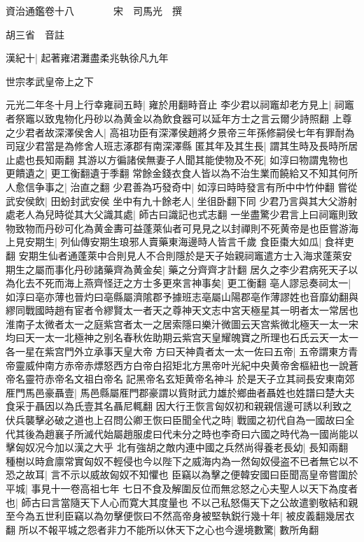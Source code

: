 資治通鑑卷十八　　　　宋　司馬光　撰

胡三省　音註

漢紀十|{
	起著雍涒灘盡柔兆執徐凡九年}


世宗孝武皇帝上之下

元光二年冬十月上行幸雍祠五畤|{
	雍於用翻畤音止}
李少君以祠竈却老方見上|{
	祠竈者祭竈以致鬼物化丹砂以為黄金以為飲食器可以延年方士之言云爾少詩照翻}
上尊之少君者故深澤侯舍人|{
	高祖功臣有深澤侯趙將夕景帝三年孫修嗣侯七年有罪耐為司寇少君當是為修舍人班志涿郡有南深澤縣}
匿其年及其生長|{
	謂其生時及長時所居止處也長知兩翻}
其游以方徧諸侯無妻子人聞其能使物及不死|{
	如淳曰物謂鬼物也}
更饋遺之|{
	更工衡翻遺于季翻}
常餘金錢衣食人皆以為不治生業而饒給又不知其何所人愈信争事之|{
	治直之翻}
少君善為巧發奇中|{
	如淳曰時時發言有所中中竹仲翻}
嘗從武安侯飲|{
	田蚡封武安侯}
坐中有九十餘老人|{
	坐徂卧翻下同}
少君乃言與其大父游射處老人為兒時從其大父識其處|{
	師古曰識記也式志翻}
一坐盡驚少君言上曰祠竈則致物致物而丹砂可化為黄金夀可益蓬萊仙者可見見之以封禪則不死黄帝是也臣嘗游海上見安期生|{
	列仙傳安期生琅邪人賣藥東海邊時人皆言千歲}
食臣棗大如瓜|{
	食祥吏翻}
安期生仙者通蓬萊中合則見人不合則隱於是天子始親祠竈遣方士入海求蓬萊安期生之屬而事化丹砂諸藥齊為黄金矣|{
	藥之分齊齊才計翻}
居久之李少君病死天子以為化去不死而海上燕齊怪迂之方士多更來言神事矣|{
	更工衡翻}
亳人謬忌奏祠太一|{
	如淳曰亳亦薄也晉灼曰亳縣屬濟隂郡予據班志亳屬山陽郡亳作薄謬姓也音靡幼翻與繆同戰國時趙有宦者令繆賢太一者天之尊神天文志中宮天極星其一明者太一常居也淮南子太微者太一之庭紫宫者太一之居索隱曰樂汁微圖云天宫紫微北極天一太一宋均曰天一太一北極神之别名春秋佐助期云紫宫天皇耀魄寶之所理也石氏云天一太一各一星在紫宫門外立承事天皇大帝}
方曰天神貴者太一太一佐曰五帝|{
	五帝謂東方青帝靈威仲南方赤帝赤熛怒西方白帝白招矩北方黑帝叶光紀中央黄帝舍樞紐也一說蒼帝名靈符赤帝名文祖白帝名記黑帝名玄矩黄帝名神斗}
於是天子立其祠長安東南郊　㕍門馬邑豪聶壹|{
	馬邑縣屬㕍門郡豪謂以貲財武力雄於鄉曲者聶姓也姓譜曰楚大夫食采于聶因以為氏壹其名聶尼輒翻}
因大行王恢言匈奴初和親親信邊可誘以利致之伏兵襲擊必破之道也上召問公卿王恢曰臣聞全代之時|{
	戰國之初代自為一國故曰全代其後為趙襄子所滅代始屬趙服䖍曰代未分之時也李奇曰六國之時代為一國尚能以擊匈奴况今加以漢之大乎}
北有強胡之敵内連中國之兵然尚得養老長幼|{
	長知兩翻}
種樹以時倉廪常實匈奴不輕侵也今以陛下之威海内為一然匈奴侵盗不已者無它以不恐之故耳|{
	言不示以威故匈奴不知懼也}
臣竊以為擊之便韓安國曰臣聞高皇帝嘗圍於平城|{
	事見十一卷高祖七年}
七日不食及解圍反位而無忿怒之心夫聖人以天下為度者也|{
	師古曰言當隨天下人心而寛大其度量也}
不以己私怒傷天下之公故遣劉敬結和親至今為五世利臣竊以為勿擊便恢曰不然高帝身被堅執鋭行幾十年|{
	被皮義翻幾居衣翻}
所以不報平城之怨者非力不能所以休天下之心也今邊境數驚|{
	數所角翻}
